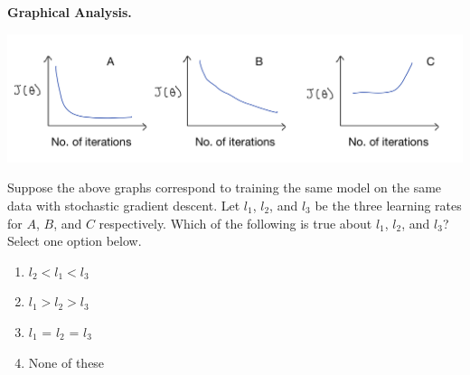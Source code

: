 \item {}
\textbf{Graphical Analysis.}
\begin{center}
  \includegraphics[scale=0.25]{general-ml-theory-tex/IMG_0632.jpg}  
\end{center}
Suppose the above graphs correspond to training the same model on the same data with stochastic gradient descent. Let $l_1$, $l_2$, and $l_3$ be the three learning rates for $A$, $B$, and $C$ respectively. Which of the following is true about $l_1$, $l_2$, and $l_3$? Select one option below.

\begin{enumerate}[label=(\alph*)]
    \item $l_2 < l_1 < l_3$
    \item $l_1 > l_2 > l_3$
    \item $l_1$ = $l_2$ = $l_3$
    \item None of these
\end{enumerate} 
